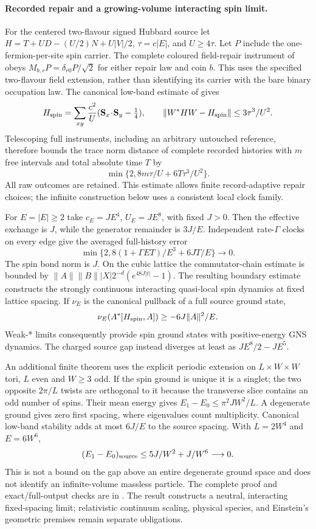\paragraph{Recorded repair and a growing-volume interacting spin limit.}
\label{sec:protected-spin-limit}
For the centered two-flavour signed Hubbard source let
$H=T+UD-(U/2)N+U|V|/2$, $\tau=c|E|$, and $U\geq4\tau$.
Let $P$ include the one-fermion-per-site spin carrier. The complete
coloured field-repair instrument of
 obeys
$M_{b,r}P=\delta_{r0}P/\sqrt2$ for either repair law and coin $b$.
This uses the specified two-flavour field extension, rather than
identifying its carrier with the bare binary occupation law.
The canonical low-band estimate of
 gives
\[
 H_{\rm spin}=\sum_{xy}\frac{c^2}{U}
       (\mathbf S_x\!\cdot\!\mathbf S_y-\tfrac14),\qquad
 \|W^*HW-H_{\rm spin}\|\leq3\tau^3/U^2.
\]
Telescoping full instruments, including an arbitrary untouched reference,
therefore bounds the trace norm distance of complete recorded histories
with $m$ free intervals and total absolute time $T$ by
\[
 \min\{2,8m\tau/U+6T\tau^3/U^2\}.
\]
All raw outcomes are retained. This estimate allows finite record-adaptive
repair choices; the infinite construction below uses a consistent local
clock family.

For $E=|E|\geq2$ take $c_E=JE^4$, $U_E=JE^8$, with fixed $J>0$.
Then the effective exchange is $J$, while the generator remainder is
$3J/E$. Independent rate-$\Gamma$ clocks on every edge give the averaged
full-history error
\[
 \min\{2,8(1+\Gamma ET)/E^3+6JT/E\}\longrightarrow0.
\]
The spin bond norm is $J$. On the cubic lattice the commutator-chain
estimate is bounded by
$\|A\|\|B\||X|2^{-d}(e^{48J|t|}-1)$.
The resulting boundary estimate constructs the strongly continuous
interacting quasi-local spin dynamics at fixed lattice spacing.
If $\nu_E$ is the canonical pullback of a full source ground state,
\[
 \nu_E(A^*[H_{\rm spin},A])\geq-6J\|A\|^2/E.
\]
Weak-* limits consequently provide spin ground states with positive-energy
GNS dynamics. The charged source gap instead diverges at least as
$JE^8/2-JE^5$.

An additional finite theorem uses the explicit periodic extension on
$L\times W\times W$ tori, $L$ even and $W\geq3$ odd. If the spin ground
is unique it is a singlet; the two opposite $2\pi/L$ twists are
orthogonal to it because the transverse slice contains an odd number
of spins. Their mean energy gives
$E_1-E_0\leq\pi^2JW^2/L$. A degenerate ground gives zero first spacing,
where eigenvalues count multiplicity. Canonical low-band stability adds
at most $6J/E$ to the source spacing. With $L=2W^4$ and $E=6W^6$,
\[
 (E_1-E_0)_{\rm source}\leq5J/W^2+J/W^6\longrightarrow0.
\]
This is not a bound on the gap above an entire degenerate ground space
and does not identify an infinite-volume massless particle. The complete
proof and exact/full-output checks are in
. The result constructs a neutral,
interacting fixed-spacing limit; relativistic continuum scaling, physical
species, and Einstein's geometric premises remain separate obligations.
